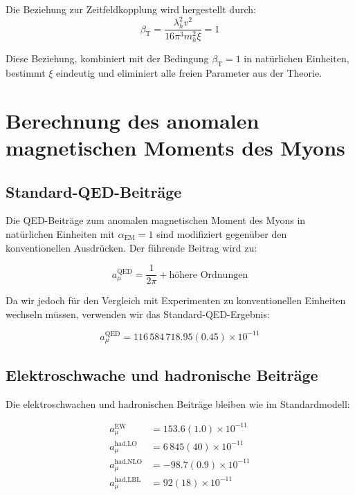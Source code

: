 \documentclass[12pt,a4paper]{article}
\newcommand{\alphaEM}{\alpha_{\text{EM}}}
\newcommand{\betaT}{\beta_{\text{T}}}
\newcommand{\xipar}{\xi}
\begin{document}
	Die Beziehung zur Zeitfeldkopplung wird hergestellt durch:
	\begin{equation}
		\betaT = \frac{\lambda_h^2 v^2}{16\pi^3 m_h^2 \xipar} = 1
		\label{eq:beta_t_relationship}
	\end{equation}
	
	Diese Beziehung, kombiniert mit der Bedingung $\betaT = 1$ in natürlichen Einheiten, bestimmt $\xipar$ eindeutig und eliminiert alle freien Parameter aus der Theorie.
	
	\section{Berechnung des anomalen magnetischen Moments des Myons}
	
	\subsection{Standard-QED-Beiträge}
	
	Die QED-Beiträge zum anomalen magnetischen Moment des Myons in natürlichen Einheiten mit $\alphaEM = 1$ sind modifiziert gegenüber den konventionellen Ausdrücken. Der führende Beitrag wird zu:
	
	\begin{equation}
		a_\mu^{\text{QED}} = \frac{1}{2\pi} + \text{höhere Ordnungen}
	\end{equation}
	
	Da wir jedoch für den Vergleich mit Experimenten zu konventionellen Einheiten wechseln müssen, verwenden wir das Standard-QED-Ergebnis:
	
	\begin{equation}
		a_\mu^{\text{QED}} = 116\,584\,718.95(0.45) \times 10^{-11}
	\end{equation}
	
	\subsection{Elektroschwache und hadronische Beiträge}
	
	Die elektroschwachen und hadronischen Beiträge bleiben wie im Standardmodell:
	
	\begin{align}
		a_\mu^{\text{EW}} &= 153.6(1.0) \times 10^{-11}\\
		a_\mu^{\text{had,LO}} &= 6\,845(40) \times 10^{-11}\\
		a_\mu^{\text{had,NLO}} &= -98.7(0.9) \times 10^{-11}\\
		a_\mu^{\text{had,LBL}} &= 92(18) \times 10^{-11}
	\end{align}
	
\end{document}
